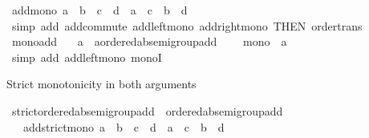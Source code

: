 \begin{isabellebody}
\ add{\isacharunderscore}{\kern0pt}mono{\isacharcolon}{\kern0pt}\ {\isachardoublequoteopen}a\ {\isasymle}\ b\ {\isasymLongrightarrow}\ c\ {\isasymle}\ d\ {\isasymLongrightarrow}\ a\ {\isacharplus}{\kern0pt}\ c\ {\isasymle}\ b\ {\isacharplus}{\kern0pt}\ d{\isachardoublequoteclose}\isanewline
%
\isadelimproof
\ \ %
\endisadelimproof
%
\isatagproof
{}\isamarkupfalse%
\ {\isacharparenleft}{\kern0pt}simp\ add{\isacharcolon}{\kern0pt}\ add{\isachardot}{\kern0pt}commute\ add{\isacharunderscore}{\kern0pt}left{\isacharunderscore}{\kern0pt}mono\ add{\isacharunderscore}{\kern0pt}right{\isacharunderscore}{\kern0pt}mono\ {\isacharbrackleft}{\kern0pt}THEN\ order{\isacharunderscore}{\kern0pt}trans{\isacharbrackright}{\kern0pt}{\isacharparenright}{\kern0pt}%
\endisatagproof
{\isafoldproof}%
%
\isadelimproof
\isanewline
%
\endisadelimproof
\isanewline
{}\isamarkupfalse%
\isanewline
\isanewline
{}\isamarkupfalse%
\ mono{\isacharunderscore}{\kern0pt}add{\isacharcolon}{\kern0pt}\isanewline
\ \ \ a\ {\isacharcolon}{\kern0pt}{\isacharcolon}{\kern0pt}\ {\isachardoublequoteopen}{\isacharprime}{\kern0pt}a{\isacharcolon}{\kern0pt}{\isacharcolon}{\kern0pt}ordered{\isacharunderscore}{\kern0pt}ab{\isacharunderscore}{\kern0pt}semigroup{\isacharunderscore}{\kern0pt}add{\isachardoublequoteclose}\ \isanewline
\ \ \ {\isachardoublequoteopen}mono\ {\isacharparenleft}{\kern0pt}{\isacharparenleft}{\kern0pt}{\isacharplus}{\kern0pt}{\isacharparenright}{\kern0pt}\ a{\isacharparenright}{\kern0pt}{\isachardoublequoteclose}\isanewline
%
\isadelimproof
\ \ %
\endisadelimproof
%
\isatagproof
{}\isamarkupfalse%
\ {\isacharparenleft}{\kern0pt}simp\ add{\isacharcolon}{\kern0pt}\ add{\isacharunderscore}{\kern0pt}left{\isacharunderscore}{\kern0pt}mono\ monoI{\isacharparenright}{\kern0pt}%
\endisatagproof
{\isafoldproof}%
%
\isadelimproof
%
\endisadelimproof
%
\begin{isamarkuptext}%
Strict monotonicity in both arguments%
\end{isamarkuptext}\isamarkuptrue%
\isamarkupfalse%
\ strict{\isacharunderscore}{\kern0pt}ordered{\isacharunderscore}{\kern0pt}ab{\isacharunderscore}{\kern0pt}semigroup{\isacharunderscore}{\kern0pt}add\ {\isacharequal}{\kern0pt}\ ordered{\isacharunderscore}{\kern0pt}ab{\isacharunderscore}{\kern0pt}semigroup{\isacharunderscore}{\kern0pt}add\ {\isacharplus}{\kern0pt}\isanewline
\ \ \ add{\isacharunderscore}{\kern0pt}strict{\isacharunderscore}{\kern0pt}mono{\isacharcolon}{\kern0pt}\ {\isachardoublequoteopen}a\ {\isacharless}{\kern0pt}\ b\ {\isasymLongrightarrow}\ c\ {\isacharless}{\kern0pt}\ d\ {\isasymLongrightarrow}\ a\ {\isacharplus}{\kern0pt}\ c\ {\isacharless}{\kern0pt}\ b\ {\isacharplus}{\kern0pt}\ d{\isachardoublequoteclose}\isanewline

\end{isabellebody}
